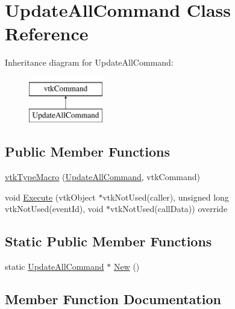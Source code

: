 \hypertarget{classUpdateAllCommand}{}\section{Update\+All\+Command Class Reference}
\label{classUpdateAllCommand}
Inheritance diagram for Update\+All\+Command\+:\begin{figure}[H]
\begin{center}
\leavevmode
\includegraphics[height=2.000000cm]{classUpdateAllCommand}
\end{center}
\end{figure}
\subsection*{Public Member Functions}
\begin{DoxyCompactItemize}
\item 
\mbox{\hyperlink{classUpdateAllCommand_a228565b2a2306d425dc7eb3cda4d39a4}{vtk\+Type\+Macro}} (\mbox{\hyperlink{classUpdateAllCommand}{Update\+All\+Command}}, vtk\+Command)
\item 
void \mbox{\hyperlink{classUpdateAllCommand_aa836cd5d538016289656d8118da879c5}{Execute}} (vtk\+Object $\ast$vtk\+Not\+Used(caller), unsigned long vtk\+Not\+Used(event\+Id), void $\ast$vtk\+Not\+Used(call\+Data)) override
\end{DoxyCompactItemize}
\subsection*{Static Public Member Functions}
\begin{DoxyCompactItemize}
\item 
static \mbox{\hyperlink{classUpdateAllCommand}{Update\+All\+Command}} $\ast$ \mbox{\hyperlink{classUpdateAllCommand_a97cd6ef1c68bb473aef27c898b175517}{New}} ()
\end{DoxyCompactItemize}


\subsection{Member Function Documentation}
\mbox{\label{classUpdateAllCommand_aa836cd5d538016289656d8118da879c5}} 
